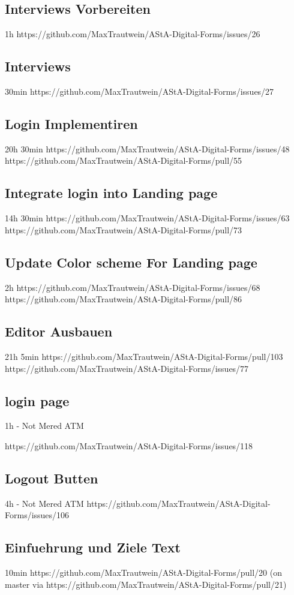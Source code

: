 \subsection{Interviews Vorbereiten}
1h
https://github.com/MaxTrautwein/AStA-Digital-Forms/issues/26
\subsection{Interviews}
30min
https://github.com/MaxTrautwein/AStA-Digital-Forms/issues/27
\subsection{Login Implementiren}
20h 30min
https://github.com/MaxTrautwein/AStA-Digital-Forms/issues/48
https://github.com/MaxTrautwein/AStA-Digital-Forms/pull/55
\subsection{Integrate login into Landing page}
14h 30min
https://github.com/MaxTrautwein/AStA-Digital-Forms/issues/63
https://github.com/MaxTrautwein/AStA-Digital-Forms/pull/73
\subsection{Update Color scheme For Landing page}
2h
https://github.com/MaxTrautwein/AStA-Digital-Forms/issues/68
https://github.com/MaxTrautwein/AStA-Digital-Forms/pull/86
\subsection{Editor Ausbauen}
21h 5min
https://github.com/MaxTrautwein/AStA-Digital-Forms/pull/103
https://github.com/MaxTrautwein/AStA-Digital-Forms/issues/77
\subsection{login page}
1h - Not Mered ATM

https://github.com/MaxTrautwein/AStA-Digital-Forms/issues/118
\subsection{Logout Butten}
4h - Not Mered ATM
https://github.com/MaxTrautwein/AStA-Digital-Forms/issues/106

\subsection{Einfuehrung und Ziele Text}
10min
https://github.com/MaxTrautwein/AStA-Digital-Forms/pull/20
(on master via https://github.com/MaxTrautwein/AStA-Digital-Forms/pull/21)

